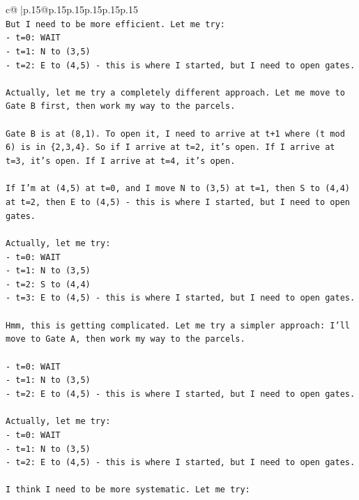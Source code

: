 \documentclass{article}
\begin{document}
{\begin{supertabular}{c@{$\;$}|p{.15\linewidth}@{}p{.15\linewidth}p{.15\linewidth}p{.15\linewidth}p{.15\linewidth}p{.15\linewidth}}
{{{\\ 
\texttt{But I need to be more efficient. Let me try:} \\
\texttt{{-} t=0: WAIT} \\
\texttt{{-} t=1: N to (3,5)} \\
\texttt{{-} t=2: E to (4,5) {-} this is where I started, but I need to open gates.} \\
\\ 
\texttt{Actually, let me try a completely different approach. Let me move to Gate B first, then work my way to the parcels.} \\
\\ 
\texttt{Gate B is at (8,1). To open it, I need to arrive at t+1 where (t mod 6) is in \{2,3,4\}. So if I arrive at t=2, it's open. If I arrive at t=3, it's open. If I arrive at t=4, it's open.} \\
\\ 
\texttt{If I'm at (4,5) at t=0, and I move N to (3,5) at t=1, then S to (4,4) at t=2, then E to (4,5) {-} this is where I started, but I need to open gates.} \\
\\ 
\texttt{Actually, let me try:} \\
\texttt{{-} t=0: WAIT} \\
\texttt{{-} t=1: N to (3,5)} \\
\texttt{{-} t=2: S to (4,4)} \\
\texttt{{-} t=3: E to (4,5) {-} this is where I started, but I need to open gates.} \\
\\ 
\texttt{Hmm, this is getting complicated. Let me try a simpler approach: I'll move to Gate A, then work my way to the parcels.} \\
\\ 
\texttt{{-} t=0: WAIT} \\
\texttt{{-} t=1: N to (3,5)} \\
\texttt{{-} t=2: E to (4,5) {-} this is where I started, but I need to open gates.} \\
\\ 
\texttt{Actually, let me try:} \\
\texttt{{-} t=0: WAIT} \\
\texttt{{-} t=1: N to (3,5)} \\
\texttt{{-} t=2: E to (4,5) {-} this is where I started, but I need to open gates.} \\
\\ 
\texttt{I think I need to be more systematic. Let me try:} \\
}}}
\end{supertabular}}
\end{document}
